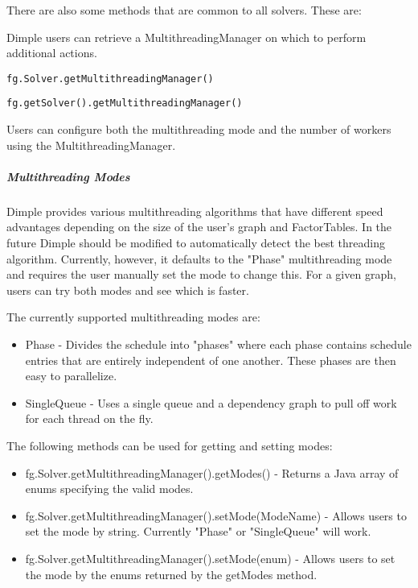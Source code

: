 There are also some methods that are common to all solvers. These are:


Dimple users can retrieve a MultithreadingManager on which to perform additional actions.

\ifmatlab
\begin{lstlisting}
fg.Solver.getMultithreadingManager()
\end{lstlisting}
\fi

\ifjava
\begin{lstlisting}
fg.getSolver().getMultithreadingManager()
\end{lstlisting}
\fi

Users can configure both the multithreading mode and the number of workers using the MultithreadingManager.

\subparagraph{Multithreading Modes}

Dimple provides various multithreading algorithms that have different speed advantages depending on the size of the user's graph and FactorTables.  In the future Dimple should be modified to automatically detect the best threading algorithm.  Currently, however, it defaults to the "Phase" multithreading mode and requires the user manually set the mode to change this.  For a given graph, users can try both modes and see which is faster.

The currently supported multithreading modes are:

\begin{itemize}
\item Phase - Divides the schedule into "phases" where each phase contains schedule entries that are entirely independent of one another.  These phases are then easy to parallelize.  
\item SingleQueue - Uses a single queue and a dependency graph to pull off work for each thread on the fly.  
\end{itemize}

The following methods can be used for getting and setting modes:


\ifmatlab

\begin{itemize}
\item fg.Solver.getMultithreadingManager().getModes() - Returns a Java array of enums specifying the valid modes.
\item fg.Solver.getMultithreadingManager().setMode(ModeName) - Allows users to set the mode by string.  Currently "Phase" or "SingleQueue" will work.
\item fg.Solver.getMultithreadingManager().setMode(enum) - Allows users to set the mode by the enums returned by the getModes method.
\end{itemize}


